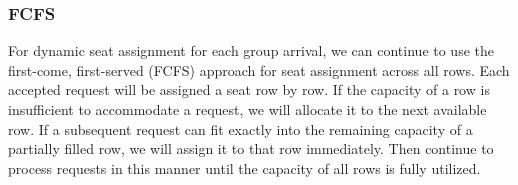 \subsubsection{FCFS}\label{largest_pattern}
For dynamic seat assignment for each group arrival, we can continue to use the first-come, first-served (FCFS) approach for seat assignment across all rows. Each accepted request will be assigned a seat row by row. If the capacity of a row is insufficient to accommodate a request, we will allocate it to the next available row. If a subsequent request can fit exactly into the remaining capacity of a partially filled row, we will assign it to that row immediately. Then continue to process requests in this manner until the capacity of all rows is fully utilized.






